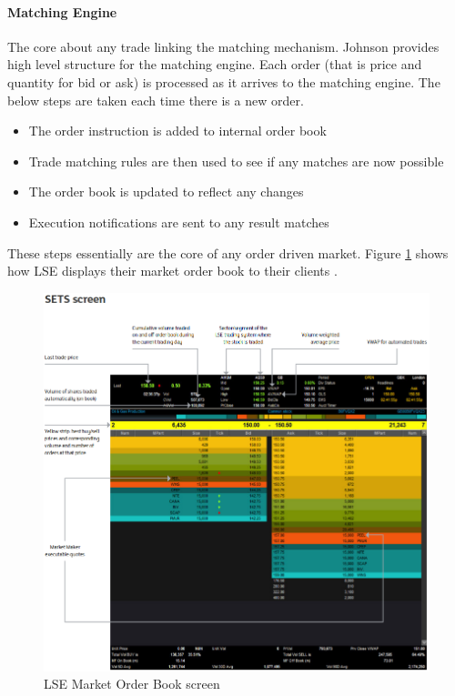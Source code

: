 \documentclass[12pt]{article}
\begin{document}
\paragraph*{Matching Engine} The core about any trade linking the matching mechanism. Johnson \cite{johnson} provides high level structure for the matching engine. Each order (that is price and quantity for bid or ask) is processed as it arrives to the matching engine. The below steps are taken each time there is a new order.
\begin{itemize}
\item The order instruction is added to internal order book
\item Trade matching rules are then used to see if any matches are now possible
\item The order book is updated to reflect any changes
\item Execution notifications are sent to any result matches
\end{itemize}
These steps essentially are the core of any order driven market. Figure \ref{fig:lse} shows how LSE displays their market order book to their clients \cite{lse}.

\begin{figure}[h!]
	\centering
  \includegraphics[scale=0.55]{lse.png}
  \caption{LSE Market Order Book screen}
  \label{fig:lse}
\end{figure}
\end{document}
